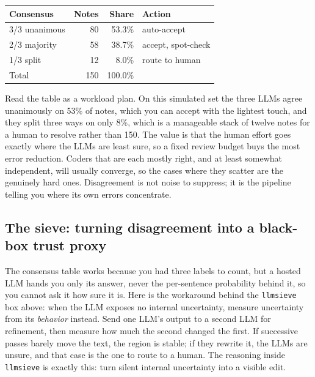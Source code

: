 \documentclass[
    a4paper,
    fontsize=10pt,
    twoside=true,
    numbers=noenddot,
]{kaobook}
\begin{document}
{\footnotesize
\begin{tabular}{lrrl}
\hline
Consensus & Notes & Share & Action \\
\hline
3/3 unanimous  &  80 & 53.3\% & auto-accept \\
2/3 majority   &  58 & 38.7\% & accept, spot-check \\
1/3 split      &  12 &  8.0\% & route to human \\
\hline
Total          & 150 & 100.0\% & \\
\hline
\end{tabular}
}

\medskip
Read the table as a workload plan. On this simulated set the three LLMs agree unanimously on 53\% of notes, which you can accept with the lightest touch, and they split three ways on only 8\%, which is a manageable stack of twelve notes for a human to resolve rather than 150. The value is that the human effort goes exactly where the LLMs are least sure, so a fixed review budget buys the most error reduction. Coders that are each mostly right, and at least somewhat independent, will usually converge, so the cases where they scatter are the genuinely hard ones. Disagreement is not noise to suppress; it is the pipeline telling you where its own errors concentrate.

\subsection{The sieve: turning disagreement into a black-box trust proxy}\label{sec:sieve}
The consensus table works because you had three labels to count, but a hosted LLM hands you only its answer, never the per-sentence probability behind it, so you cannot ask it how sure it is. Here is the workaround behind the \texttt{llmsieve} box above: when the LLM exposes no internal uncertainty, measure uncertainty from its \emph{behavior} instead. Send one LLM's output to a second LLM for refinement, then measure how much the second changed the first. If successive passes barely move the text, the region is stable; if they rewrite it, the LLMs are unsure, and that case is the one to route to a human. The reasoning inside \texttt{llmsieve} is exactly this: turn silent internal uncertainty into a visible edit.
\end{document}
